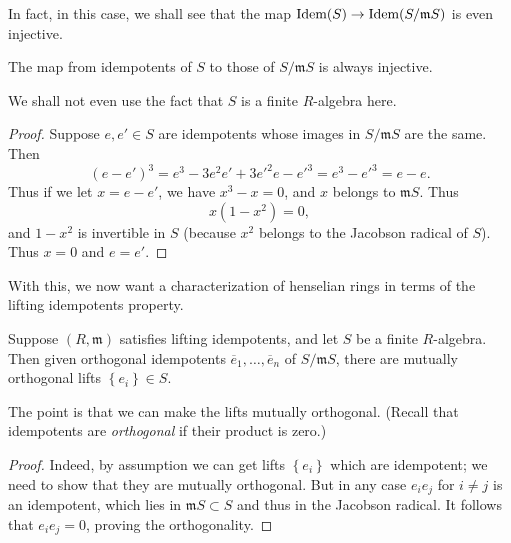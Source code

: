 In fact, in this case, we shall see that the map $\operatorname{\text{Idem}}(S) \to
\operatorname{\text{Idem}}(S/\mathfrak{m}S)$ is even injective.
\begin{proposition} 
The map from idempotents of $S$ to those of $S/\mathfrak{m} S$ is
always injective.
\end{proposition}
We shall not even use the fact that $S$ is a finite $R$-algebra here.

\begin{proof} 
Suppose $e, e' \in S$ are  idempotents whose images in $S/\mathfrak{m}S$ are the
same. Then 
\[ (e-e')^3 = e^3 -3e^2 e' + 3e'^2 e- e'^3 = e^3 - e'^3 = e - e. \]
Thus if we let $x = e - e'$, we have $x^3 - x =0$, and $x $ belongs to
$\mathfrak{m}S$. Thus
\[ x(1-x^2) = 0,  \]
and $1-x^2$ is invertible in $S$ (because $x^2$ belongs to the Jacobson radical
of $S$). Thus $x =0 $ and $e = e'$.
\end{proof}


With this, we now want a characterization of henselian rings in terms of the
lifting idempotents property.

\begin{proposition} \label{orthogonallifts}
Suppose $(R, \mathfrak{m})$ satisfies lifting idempotents, and let $S$ be a
finite $R$-algebra. Then given
orthogonal idempotents $\overline{e}_1, \dots, \overline{e}_n$ of $S/\mathfrak{m}S$, there are
mutually orthogonal lifts $\left\{e_i\right\} \in S$. 
\end{proposition} 

The point is that we can make the lifts mutually orthogonal. (Recall that
idempotents are \emph{orthogonal} if their product is zero.)
\begin{proof} 
Indeed, by assumption we can get lifts $\left\{e_i\right\}$ which are
idempotent; we need to show that they are mutually orthogonal. But in any case
$e_i e_j$ for $i \neq j$ is an idempotent, which lies in 
$\mathfrak{m}S \subset S$ and thus in the Jacobson radical. It follows that
$e_i e_j = 0$, proving the orthogonality.
\end{proof} 

